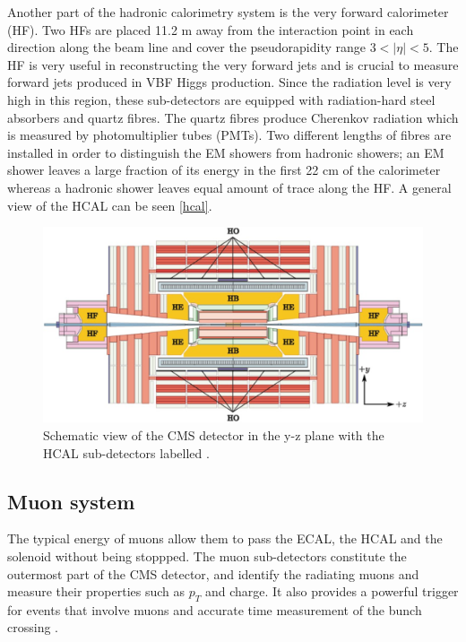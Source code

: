Another part of the hadronic calorimetry system is the very forward calorimeter (HF). Two HFs are placed 11.2 m away from the interaction point in each direction along the beam line and cover the pseudorapidity range $3<|\eta|<5$. The HF is very useful in reconstructing the very forward jets and is crucial to measure forward jets produced in VBF Higgs production. Since the radiation level is very high in this region, these sub-detectors are equipped with radiation-hard steel absorbers and quartz fibres. The quartz fibres produce Cherenkov radiation which is measured by photomultiplier tubes (PMTs). Two different lengths of fibres are installed in order to distinguish the EM showers from hadronic showers; an EM shower leaves a large fraction of its energy in the first 22 cm of the calorimeter whereas a hadronic shower leaves equal amount of trace along the HF. A general view of the HCAL can be seen \autoref{hcal}.

\begin{figure}[ht]
	\centering
	\includegraphics[width=\textwidth]{MSc_Thesis/fig/hcal.png}
	\vspace{2mm}
	\caption[Schematic view of the CMS detector in the y-z plane with the HCAL sub-detectors labelled.]{Schematic view of the CMS detector in the y-z plane with the HCAL sub-detectors labelled \cite{CMS-PHO-GEN-2012-002}.}
	\label{hcal}
\end{figure}

\subsection{Muon system}

The typical energy of muons allow them to pass the ECAL, the HCAL and the solenoid without being stoppped. The muon sub-detectors constitute the outermost part of the CMS detector, and identify the radiating muons and measure their properties such as $p_T$ and charge. It also provides a powerful trigger for events that involve muons and accurate time measurement of the bunch crossing \cite{Layter:343814}.

